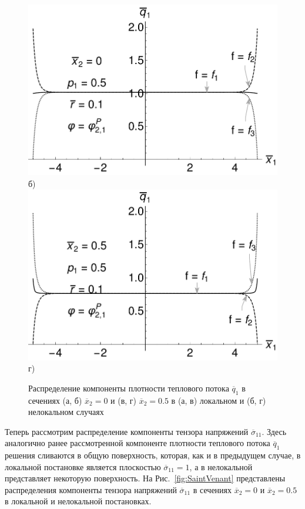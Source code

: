 \begin{figure}[ht]
\begin{minipage}[b][][b]{0.49\linewidth}
    \end{minipage}
    \hfill
    \begin{minipage}[b][][b]{0.49\linewidth}\centering
        \includegraphics[width=\linewidth]{pics/FluxStabilityX0P05.pdf} \\ б)
        \includegraphics[width=\linewidth]{pics/FluxStabilityX05P05.pdf} \\ г)
    \end{minipage}
    \caption{Распределение компоненты плотности теплового потока $\overline{q}_1$ в сечениях (а, б) $\overline{x}_2 = 0$ и (в, г) $\overline{x}_2 = 0.5$ в (а, в) локальном и (б, г) нелокальном случаях}
    \label{fig:FluxStability}
\end{figure}

Теперь рассмотрим распределение компоненты тензора напряжений $\overline{\sigma}_{11}$. Здесь аналогично ранее рассмотренной компоненте плотности теплового потока $\overline{q}_1$ решения сливаются в общую поверхность, которая, как и в предыдущем случае, в локальной постановке является плоскостью $\overline{\sigma}_{11} = 1$, а в нелокальной представляет некоторую поверхность. На Рис.~\ref{fig:SaintVenant} представлены распределения компоненты тензора напряжений $\overline{\sigma}_{11}$ в сечениях $\overline{x}_2 = 0$ и $\overline{x}_2 = 0.5$ в локальной и нелокальной постановках.

